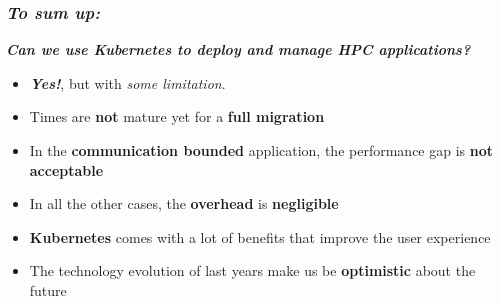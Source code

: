 \begin{frame}
  \frametitle{ \textit{To sum up:}}
  \large{
     \textit\textbf{{Can we use Kubernetes to deploy and manage HPC applications?}}
  }
  \pause
  \begin{itemize}
    \item {} \alert{\textit{\textbf{Yes!}}}, but with \textit{some limitation}.
    \pause
    \item {} Times are \textbf{not}
      mature yet for a \alert{\textbf{full migration}}
    \item {} In the \textbf{communication bounded} application, the performance gap
      is \textbf{not acceptable}
    \item {} In all the other cases, the \alert{\textbf{overhead}} is \alert{\textbf{negligible}}
    \pause
    \item {} \textbf{Kubernetes} comes with a lot of benefits
      that improve the user experience
    \item {} The technology evolution of last years make us
      be \alert{\textbf{optimistic}} about the future
  \end{itemize}
\end{frame}
